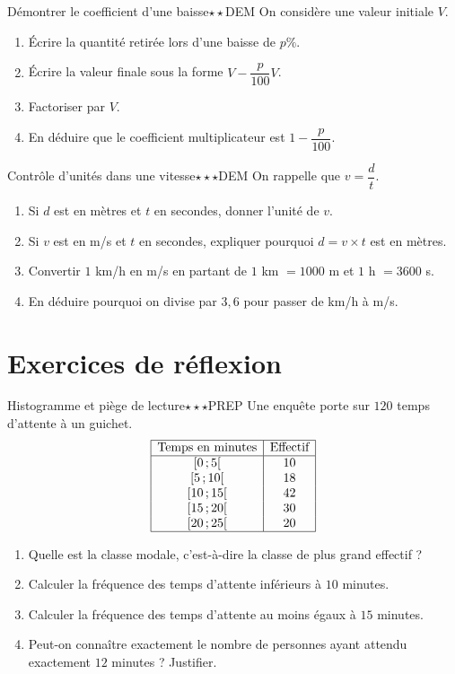 \documentclass[11pt,a4paper]{article}
\newcommand{\classe}[2]{\ensuremath{[#1\,;#2[}}
\newcounter{exo}
\begin{document}
\begin{exobox}{Démontrer le coefficient d'une baisse}{$\star\star$}{DEM}
On considère une valeur initiale $V$.
\begin{enumerate}
\item Écrire la quantité retirée lors d'une baisse de $p\%$.
\item Écrire la valeur finale sous la forme $V-\dfrac{p}{100}V$.
\item Factoriser par $V$.
\item En déduire que le coefficient multiplicateur est $1-\dfrac{p}{100}$.
\end{enumerate}
\end{exobox}

\begin{exobox}{Contrôle d'unités dans une vitesse}{$\star\star\star$}{DEM}
On rappelle que $v=\dfrac{d}{t}$.
\begin{enumerate}
\item Si $d$ est en mètres et $t$ en secondes, donner l'unité de $v$.
\item Si $v$ est en m/s et $t$ en secondes, expliquer pourquoi $d=v\times t$ est en mètres.
\item Convertir $1$ km/h en m/s en partant de $1$ km $=1000$ m et $1$ h $=3600$ s.
\item En déduire pourquoi on divise par $3{,}6$ pour passer de km/h à m/s.
\end{enumerate}
\end{exobox}

\section{Exercices de réflexion}

\begin{exobox}{Histogramme et piège de lecture}{$\star\star\star$}{PREP}
Une enquête porte sur $120$ temps d'attente à un guichet.
\[
\begin{array}{|c|c|}
\hline
\text{Temps en minutes} & \text{Effectif} \\
\hline
\classe{0}{5} & 10 \\
\classe{5}{10} & 18 \\
\classe{10}{15} & 42 \\
\classe{15}{20} & 30 \\
\classe{20}{25} & 20 \\
\hline
\end{array}
\]
\begin{enumerate}
\item Quelle est la classe modale, c'est-à-dire la classe de plus grand effectif ?
\item Calculer la fréquence des temps d'attente inférieurs à $10$ minutes.
\item Calculer la fréquence des temps d'attente au moins égaux à $15$ minutes.
\item Peut-on connaître exactement le nombre de personnes ayant attendu exactement $12$ minutes ? Justifier.
\end{enumerate}
\end{exobox}
\end{document}
